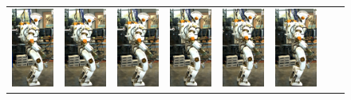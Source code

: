 \documentclass[letterpaper, 10 pt, conference]{ieeeconf}  %
\begin{document}
\begin{figure}[h]
\centering
  \begin{tabular}{cccccccc}
    \includegraphics[width=0.72in]{val1c} &
    \includegraphics[width=0.72in]{val2c} &
    \includegraphics[width=0.72in]{val3c} &
    \includegraphics[width=0.72in]{val4c} &
    \includegraphics[width=0.72in]{val5c} &
    \includegraphics[width=0.72in]{val6c} &

\end{tabular}
\end{figure}
\end{document}

